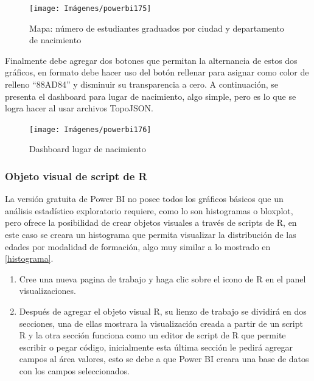 \documentclass[
]{book}
\begin{document}
\begin{figure}

{\centering \texttt{[image: Imágenes/powerbi175]} 

}

\caption{Mapa: número de estudiantes graduados por ciudad y departamento de nacimiento}\label{fig:paso11mapadeformas-fig}
\end{figure}

Finalmente debe agregar dos botones que permitan la alternancia de estos dos gráficos, en formato debe hacer uso del botón rellenar para asignar como color de relleno ``88AD84'' y disminuir su transparencia a cero. A continuación, se presenta el dashboard para lugar de nacimiento, algo simple, pero es lo que se logra hacer al usar archivos TopoJSON.

\begin{figure}

{\centering \texttt{[image: Imágenes/powerbi176]} 

}

\caption{Dashboard lugar de nacimiento}\label{fig:dashboardlugarnacimeinto-fig}
\end{figure}

\hypertarget{objeto-visual-de-script-de-r}{%
\subsubsection{Objeto visual de script de R}\label{objeto-visual-de-script-de-r}}

La versión gratuita de Power BI no posee todos los gráficos básicos que un análisis estadístico exploratorio requiere, como lo son histogramas o bloxplot, pero ofrece la posibilidad de crear objetos visuales a través de scripts de R, en este caso se creara un histograma que permita visualizar la distribución de las edades por modalidad de formación, algo muy similar a lo mostrado en \ref{histograma}.

\begin{enumerate}
\def\labelenumi{\arabic{enumi}.}
\item
  Cree una nueva pagina de trabajo y haga clic sobre el icono de R en el panel visualizaciones.
\item
  Después de agregar el objeto visual R, su lienzo de trabajo se dividirá en dos secciones, una de ellas mostrara la visualización creada a partir de un script R y la otra sección funciona como un editor de script de R que permite escribir o pegar código, inicialmente esta última sección le pedirá agregar campos al área valores, esto se debe a que Power BI creara una base de datos con los campos seleccionados.
\end{enumerate}
\end{document}
